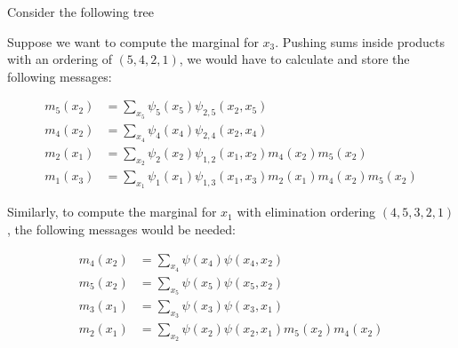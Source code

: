 \documentclass{harvardml}
\theoremstyle{definition}
\theoremstyle{plain}
\theoremstyle{definition}
\theoremstyle{remark}
\begin{document}
Consider the following tree
\begin{center}
\end{center}

Suppose we want to compute the marginal for $x_3$. Pushing sums inside products with an ordering of $(5,4,2,1)$, we would have to calculate and store the following messages:
\begin{center}
\begin{align*}
    m_5(x_2) &= \sum_{x_5} \psi_5(x_5) \psi_{2,5}(x_2, x_5)\\
    m_4(x_2) &= \sum_{x_4}\psi_4(x_4) \psi_{2,4}(x_2, x_4)\\
    m_2(x_1) &= \sum_{x_2}\psi_2(x_2) \psi_{1,2}(x_1, x_2) m_4(x_2) m_5(x_2)\\
    m_1(x_3) &= \sum_{x_1} \psi_1(x_1) \psi_{1,3}(x_1, x_3) m_2(x_1) m_4(x_2) m_5(x_2)
\end{align*}
\end{center}


Similarly, to compute the marginal for $x_1$ with  elimination ordering $(4,5,3,2,1)$, the following messages would be needed:

\begin{center}
\begin{align*}
    m_4(x_2) &= \sum_{x_4} \psi(x_4)\psi(x_4, x_2)\\
    m_5(x_2) &= \sum_{x_5} \psi(x_5)\psi(x_5, x_2)\\
    m_3(x_1) &= \sum_{x_3} \psi(x_3) \psi(x_3, x_1)\\
    m_2(x_1) &= \sum_{x_2} \psi(x_2) \psi(x_2, x_1) m_5(x_2) m_4(x_2)
\end{align*}
\end{center}
\end{document}
